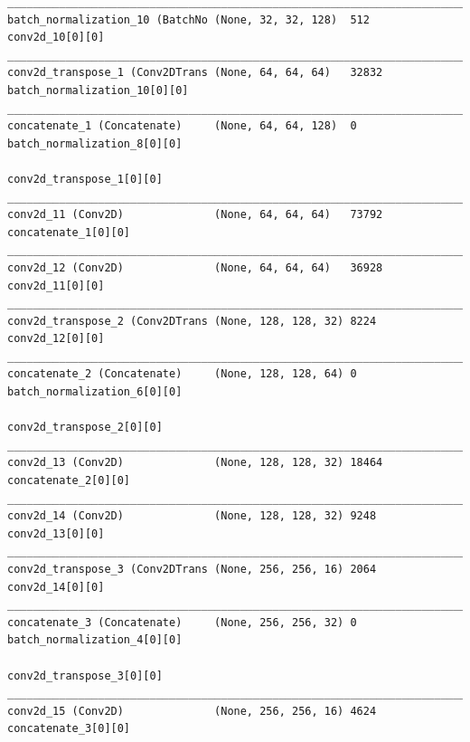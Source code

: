 \begin{lstlisting}[basicstyle=\tiny]
__________________________________________________________________________________________________
batch_normalization_10 (BatchNo (None, 32, 32, 128)  512         conv2d_10[0][0]                  
__________________________________________________________________________________________________
conv2d_transpose_1 (Conv2DTrans (None, 64, 64, 64)   32832       batch_normalization_10[0][0]     
__________________________________________________________________________________________________
concatenate_1 (Concatenate)     (None, 64, 64, 128)  0           batch_normalization_8[0][0]      
                                                                 conv2d_transpose_1[0][0]         
__________________________________________________________________________________________________
conv2d_11 (Conv2D)              (None, 64, 64, 64)   73792       concatenate_1[0][0]              
__________________________________________________________________________________________________
conv2d_12 (Conv2D)              (None, 64, 64, 64)   36928       conv2d_11[0][0]                  
__________________________________________________________________________________________________
conv2d_transpose_2 (Conv2DTrans (None, 128, 128, 32) 8224        conv2d_12[0][0]                  
__________________________________________________________________________________________________
concatenate_2 (Concatenate)     (None, 128, 128, 64) 0           batch_normalization_6[0][0]      
                                                                 conv2d_transpose_2[0][0]         
__________________________________________________________________________________________________
conv2d_13 (Conv2D)              (None, 128, 128, 32) 18464       concatenate_2[0][0]              
__________________________________________________________________________________________________
conv2d_14 (Conv2D)              (None, 128, 128, 32) 9248        conv2d_13[0][0]                  
__________________________________________________________________________________________________
conv2d_transpose_3 (Conv2DTrans (None, 256, 256, 16) 2064        conv2d_14[0][0]                  
__________________________________________________________________________________________________
concatenate_3 (Concatenate)     (None, 256, 256, 32) 0           batch_normalization_4[0][0]      
                                                                 conv2d_transpose_3[0][0]         
__________________________________________________________________________________________________
conv2d_15 (Conv2D)              (None, 256, 256, 16) 4624        concatenate_3[0][0]              

\end{lstlisting}
